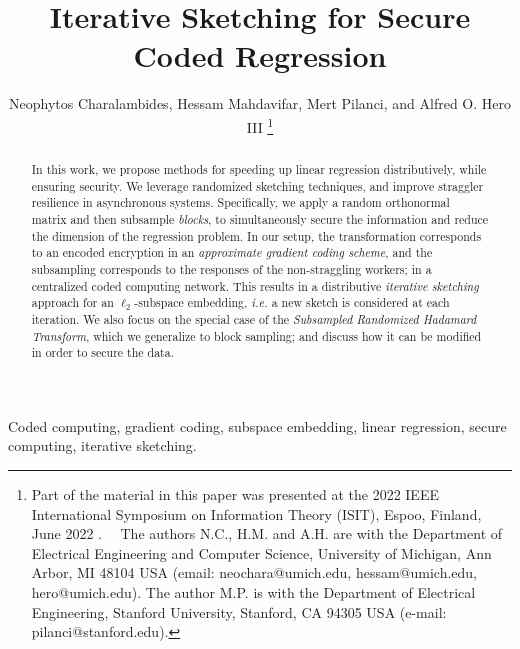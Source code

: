 \documentclass[journal,letterpaper,onecolumn,twoside,nofonttune]{IEEEtran}
\newcommand{\white}{\color{white}}
\begin{document}
\title{Iterative Sketching for Secure Coded Regression}

\author{\large%
Neophytos Charalambides, Hessam Mahdavifar, Mert Pilanci, and Alfred O. Hero III
  \vspace{-.25in}
  \thanks{Part of the material in this paper was presented at the 2022 IEEE International Symposium on Information Theory (ISIT), Espoo, Finland, June 2022 \cite{CMPH22}. \newline
  ${\white..}$ The authors N.C., H.M. and A.H. are with the Department of Electrical Engineering and Computer Science, University of Michigan, Ann Arbor, MI 48104 USA (email: neochara@umich.edu, hessam@umich.edu, hero@umich.edu). The author M.P. is with the Department of Electrical Engineering, Stanford University, Stanford, CA 94305 USA (e-mail: pilanci@stanford.edu).}
}

\maketitle

\begin{abstract}
In this work, we propose methods for speeding up linear regression distributively, while ensuring security. We leverage randomized sketching techniques, and improve straggler resilience in asynchronous systems. Specifically, we apply a random orthonormal matrix and then subsample \textit{blocks}, to simultaneously secure the information and reduce the dimension of the regression problem. In our setup, the transformation corresponds to an encoded encryption in an \textit{approximate gradient coding scheme}, and the subsampling corresponds to the responses of the non-straggling workers; in a centralized coded computing network. This results in a distributive \textit{iterative sketching} approach for an $\ell_2$-subspace embedding, \textit{i.e.} a new sketch is considered at each iteration. We also focus on the special case of the \textit{Subsampled Randomized Hadamard Transform}, which we generalize to block sampling; and discuss how it can be modified in order to secure the data.
\end{abstract}

\begin{IEEEkeywords}
Coded computing, gradient coding, subspace embedding, linear regression, secure computing, iterative sketching.
\end{IEEEkeywords}
\end{document}
